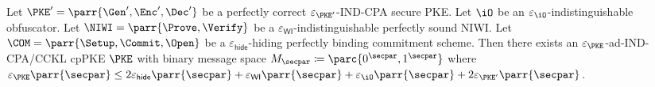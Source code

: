 \begin{theorem}
    Let \(\PKE' = \parr{\Gen',\Enc',\Dec'}\) be a perfectly correct \(\varepsilon_{\PKE'}\)-IND-CPA secure PKE.
    Let \(\iO\) be an \(\varepsilon_{\iO}\)-indistinguishable obfuscator.
    Let \(\NIWI = \parr{\Prove,\Verify}\) be a \(\varepsilon_{\textsf{WI}}\)-indistinguishable perfectly sound NIWI.
    Let \(\COM = \parr{\Setup,\Commit,\Open}\) be a \(\varepsilon_{\textsf{hide}}\)-hiding perfectly binding commitment scheme.
    Then there exists an \(\varepsilon_{\PKE}\)-ad-IND-CPA/CCKL cpPKE \(\PKE\) with binary message space \(M_\secpar \coloneq \parc{0^\secpar,1^\secpar}\) where \(\varepsilon_{\PKE}\parr{\secpar} \leq 2\varepsilon_{\textsf{hide}}\parr{\secpar} + \varepsilon_{\textsf{WI}}\parr{\secpar} + \varepsilon_{\iO}\parr{\secpar} + 2\varepsilon_{\PKE'}\parr{\secpar}\).
\end{theorem}

